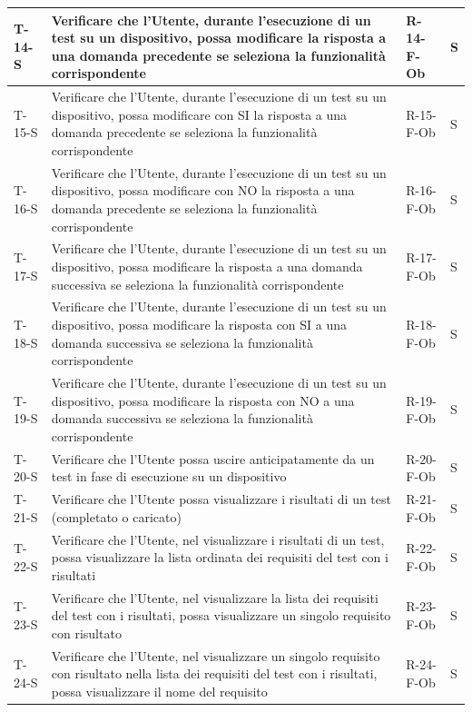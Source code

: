 \documentclass[a4paper,12pt]{article}
\begin{document}
{{\begin{longtable}{|p{}|p{}|p{}|p{}|}
                T-14-S & Verificare che l'Utente, durante l'esecuzione di un test su un dispositivo, possa modificare la risposta a una domanda precedente se seleziona la funzionalità corrispondente & R-14-F-Ob & S \\ \hline
                T-15-S & Verificare che l'Utente, durante l'esecuzione di un test su un dispositivo, possa modificare con SI la risposta a una domanda precedente se seleziona la funzionalità corrispondente & R-15-F-Ob & S \\ \hline
                T-16-S & Verificare che l'Utente, durante l'esecuzione di un test su un dispositivo, possa modificare con NO la risposta a una domanda precedente se seleziona la funzionalità corrispondente & R-16-F-Ob & S \\ \hline
                T-17-S & Verificare che l'Utente, durante l'esecuzione di un test su un dispositivo, possa modificare la risposta a una domanda successiva se seleziona la funzionalità corrispondente & R-17-F-Ob & S \\ \hline
                T-18-S & Verificare che l'Utente, durante l'esecuzione di un test su un dispositivo, possa modificare la risposta con SI a una domanda successiva se seleziona la funzionalità corrispondente & R-18-F-Ob & S \\ \hline
                T-19-S & Verificare che l'Utente, durante l'esecuzione di un test su un dispositivo, possa modificare la risposta con NO a una domanda successiva se seleziona la funzionalità corrispondente & R-19-F-Ob & S \\ \hline
                T-20-S & Verificare che l'Utente possa uscire anticipatamente da un test in fase di esecuzione su un dispositivo & R-20-F-Ob & S \\ \hline
                T-21-S & Verificare che l'Utente possa visualizzare i risultati di un test (completato o caricato) & R-21-F-Ob & S \\ \hline
                T-22-S & Verificare che l'Utente, nel visualizzare i risultati di un test, possa visualizzare la lista ordinata dei requisiti del test con i risultati & R-22-F-Ob & S \\ \hline
                T-23-S & Verificare che l'Utente, nel visualizzare la lista dei requisiti del test con i risultati, possa visualizzare un singolo requisito con risultato & R-23-F-Ob & S \\ \hline
                T-24-S & Verificare che l'Utente, nel visualizzare un singolo requisito con risultato nella lista dei requisiti del test con i risultati, possa visualizzare il nome del requisito & R-24-F-Ob & S \\ \hline

\end{longtable}}}
\end{document}
